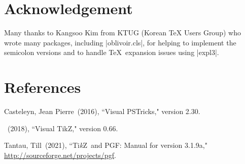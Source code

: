 \documentclass[a4paper,amsmath,chapter]{oblivoir}
\newcommand*\Tikz{Ti\textit{k}Z}
\let\TikZ\Tikz
\def\hpara{\hangpara{1.52em}{1}}
\begin{document}
\begin{itemize}
\end{itemize}


\chapter*{Acknowledgement}

Many thanks to Kangsoo Kim from KTUG (Korean TeX Users Group) who wrote many packages, including |oblivoir.cls|, for helping to implement the semicolon versions and to handle \TeX\ expansion issues using |expl3|.

\chapter*{References}

\hpara{}Casteleyn, Jean Pierre~(2016), ``Visual PSTricks," version 2.30.

\hpara{}\uline{\hphantom{Casteleyn, Jean Pierre}}~(2018), ``Visual TikZ," version 0.66.

\hpara{}Tantau, Till~(2021), ``\TikZ\ and PGF: Manual for version 3.1.9a," \url{http://sourceforge.net/projects/pgf}.

\clearpage
\printindex
\end{document}
